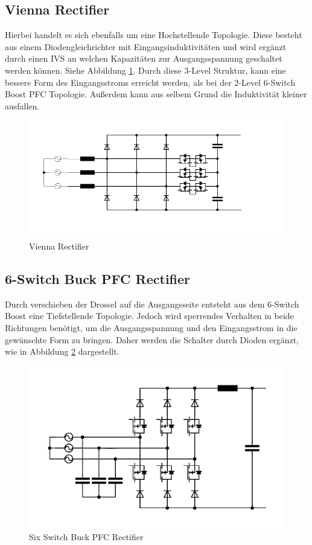 	\subsection{Vienna Rectifier}
		Hierbei handelt es sich ebenfalls um eine Hochstellende Topologie. Diese besteht aus einem Diodengleichrichter mit Eingangsinduktivitäten und wird ergänzt durch einen \gls{IVS} an welchen Kapazitäten zur Ausgangsspannung geschaltet werden können. Siehe Abbildung \ref{fig:vienna}. Durch diese 3-Level Struktur, kann eine bessere Form des Eingangsstroms erreicht werden, als bei der 2-Level 6-Switch Boost PFC Topologie. Außerdem kann aus selbem Grund die Induktivität kleiner ausfallen.
		\begin{figure}[H]
			\centering
			\includegraphics[width=0.9\linewidth]{content/Grafiken/Vienna}
			\caption{Vienna Rectifier}
			\label{fig:vienna}
		\end{figure}
		
	\subsection{6-Switch Buck PFC Rectifier}
		Durch verschieben der Drossel auf die Ausgangsseite entsteht aus dem 6-Switch Boost eine Tiefstellende Topologie. Jedoch wird sperrendes Verhalten in beide Richtungen benötigt, um die Ausgangsspannung und den Eingangsstrom in die gewünschte Form zu bringen. Daher werden die Schalter durch Dioden ergänzt, wie in Abbildung \ref{fig:sixswitchbuck} dargestellt. 
		
		\begin{figure}[H]
			\centering
			\includegraphics[width=0.9\linewidth]{content/Grafiken/SixSwitchBuck}
			\caption{Six Switch Buck PFC Rectifier}
			\label{fig:sixswitchbuck}
		\end{figure}
	
